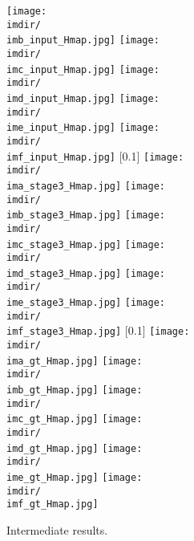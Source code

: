 \documentclass[runningheads]{llncs}
\begin{document}
\begin{figure*}[hthb]
{\texttt{[image: \\imdir/\\imb\_input\_Hmap.jpg]}
\texttt{[image: \\imdir/\\imc\_input\_Hmap.jpg]}
\texttt{[image: \\imdir/\\imd\_input\_Hmap.jpg]}
\texttt{[image: \\imdir/\\ime\_input\_Hmap.jpg]}
\texttt{[image: \\imdir/\\imf\_input\_Hmap.jpg]}
}
[0.1\linewidth]
{
\texttt{[image: \\imdir/\\ima\_stage3\_Hmap.jpg]}
\texttt{[image: \\imdir/\\imb\_stage3\_Hmap.jpg]}
\texttt{[image: \\imdir/\\imc\_stage3\_Hmap.jpg]}
\texttt{[image: \\imdir/\\imd\_stage3\_Hmap.jpg]}
\texttt{[image: \\imdir/\\ime\_stage3\_Hmap.jpg]}
\texttt{[image: \\imdir/\\imf\_stage3\_Hmap.jpg]}
}
[0.1\linewidth]
{
\texttt{[image: \\imdir/\\ima\_gt\_Hmap.jpg]}
\texttt{[image: \\imdir/\\imb\_gt\_Hmap.jpg]}
\texttt{[image: \\imdir/\\imc\_gt\_Hmap.jpg]}
\texttt{[image: \\imdir/\\imd\_gt\_Hmap.jpg]}
\texttt{[image: \\imdir/\\ime\_gt\_Hmap.jpg]}
\texttt{[image: \\imdir/\\imf\_gt\_Hmap.jpg]}
}
\caption{Intermediate results.}
\label{fig:im_result}
\end{figure*}



\newcommand{\hrdir}{figures/hr_details}
\newcommand{\hra}{a3427_1_4}
\newcommand{\hrb}{a0196_1_4}
\newcommand{\hrc}{a4732_1_1}
\newcommand{\hrd}{a3977_1_5}
\newcommand{\hre}{a4696_1_5}
\newcommand{\hrf}{a0249_1_5}
\newcommand{\hrg}{a0779_1_3}
\newcommand{\hrh}{a1580_1_4}
\end{document}
